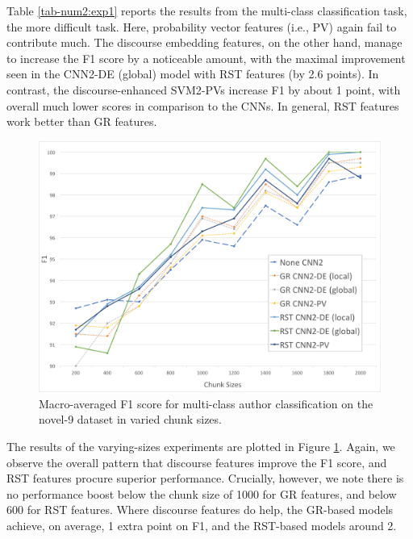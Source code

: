 Table \ref{tab-num2:exp1} reports the results from the multi-class classification task, the more difficult task. 
Here, probability vector features (i.e., PV) again fail to contribute much.
The discourse embedding features, on the other hand, manage to increase the F1 score by a noticeable amount, with the maximal improvement seen in the CNN2-DE (global) model with RST features (by 2.6 points).
In contrast, the discourse-enhanced SVM2-PVs increase F1 by about 1 point, with overall much lower scores in comparison to the CNNs.
In general, RST features work better than GR features.

\begin{figure}[t]
\includegraphics[scale=0.25]{plots/longer2_exp1.png}
\vspace{-1.2em}
\caption{Macro-averaged F1 score for multi-class author classification on the novel-9 dataset in varied chunk sizes.}
\label{fig:exp1-varying-sizes}
\end{figure}

The results of the varying-sizes experiments are plotted in Figure \ref{fig:exp1-varying-sizes}.
Again, we observe the overall pattern that discourse features improve the F1 score, and RST features procure superior performance. 
Crucially, however, we note there is no performance boost below the chunk size of 1000 for GR features, and below 600 for RST features.
Where discourse features do help, the GR-based models achieve, on average, 1 extra point on F1, and the RST-based models around 2. 

\medskip

